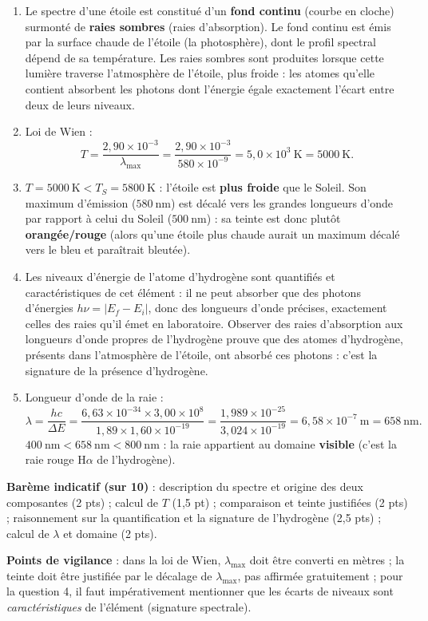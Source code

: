 \documentclass[11pt]{article}
\begin{document}
\begin{corrige}
\begin{enumerate}
\item Le spectre d'une étoile est constitué d'un \textbf{fond continu} (courbe en cloche) surmonté de \textbf{raies sombres} (raies d'absorption). Le fond continu est émis par la surface chaude de l'étoile (la photosphère), dont le profil spectral dépend de sa température. Les raies sombres sont produites lorsque cette lumière traverse l'atmosphère de l'étoile, plus froide : les atomes qu'elle contient absorbent les photons dont l'énergie égale exactement l'écart entre deux de leurs niveaux.
\item Loi de Wien :
\[ T = \frac{2,90\times10^{-3}}{\lambda_{\max}} = \frac{2,90\times10^{-3}}{580\times10^{-9}} = 5,0\times10^{3}\ \mathrm{K} = 5000\ \mathrm{K}. \]
\item $T = 5000\ \mathrm{K} < T_S = 5800\ \mathrm{K}$ : l'étoile est \textbf{plus froide} que le Soleil. Son maximum d'émission ($580\ \mathrm{nm}$) est décalé vers les grandes longueurs d'onde par rapport à celui du Soleil ($500\ \mathrm{nm}$) : sa teinte est donc plutôt \textbf{orangée/rouge} (alors qu'une étoile plus chaude aurait un maximum décalé vers le bleu et paraîtrait bleutée).
\item Les niveaux d'énergie de l'atome d'hydrogène sont quantifiés et caractéristiques de cet élément : il ne peut absorber que des photons d'énergies $h\nu = |E_f - E_i|$, donc des longueurs d'onde précises, exactement celles des raies qu'il émet en laboratoire. Observer des raies d'absorption aux longueurs d'onde propres de l'hydrogène prouve que des atomes d'hydrogène, présents dans l'atmosphère de l'étoile, ont absorbé ces photons : c'est la signature de la présence d'hydrogène.
\item Longueur d'onde de la raie :
\[ \lambda = \frac{hc}{\Delta E} = \frac{6,63\times10^{-34}\times3,00\times10^8}{1,89\times1,60\times10^{-19}} = \frac{1,989\times10^{-25}}{3,024\times10^{-19}} = 6,58\times10^{-7}\ \mathrm{m} = 658\ \mathrm{nm}. \]
$400\ \mathrm{nm} < 658\ \mathrm{nm} < 800\ \mathrm{nm}$ : la raie appartient au domaine \textbf{visible} (c'est la raie rouge H$\alpha$ de l'hydrogène).
\end{enumerate}
\textbf{Barème indicatif (sur 10)} : description du spectre et origine des deux composantes (2 pts) ; calcul de $T$ (1,5 pt) ; comparaison et teinte justifiées (2 pts) ; raisonnement sur la quantification et la signature de l'hydrogène (2,5 pts) ; calcul de $\lambda$ et domaine (2 pts).

\textbf{Points de vigilance} : dans la loi de Wien, $\lambda_{\max}$ doit être converti en mètres ; la teinte doit être justifiée par le décalage de $\lambda_{\max}$, pas affirmée gratuitement ; pour la question 4, il faut impérativement mentionner que les écarts de niveaux sont \emph{caractéristiques} de l'élément (signature spectrale).
\end{corrige}
\end{document}
